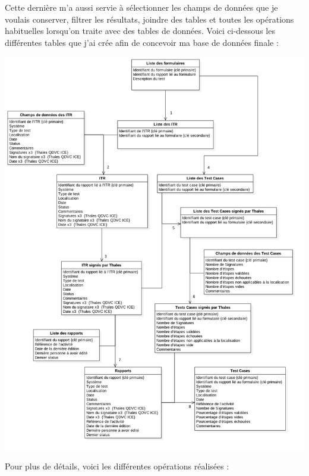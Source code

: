 Cette dernière m'a aussi servie à sélectionner les champs de données que je voulais conserver, filtrer les résultats, joindre des tables et toutes les opérations habituelles lorsqu'on traite avec des tables de données. 
Voici ci-dessous les différentes tables que j'ai crée afin de concevoir ma base de données finale :
\newpage
\begin{center}
\includegraphics[scale=0.5]{ressources/images/figures/bd.png}
\end{center}
\newpage
Pour plus de détails, voici les différentes opérations réalisées :
